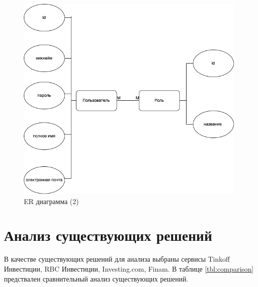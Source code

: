 \begin{figure}[h!]
	\begin{center}
		\includegraphics[scale=0.6]{img/er2.drawio.png}
	\end{center}
	\captionsetup{justification=centering}
	\caption{ER диаграмма (2)}
	\label{img:er2}
\end{figure}
\newpage


\section{Анализ существующих решений}
В качестве существующих решений для анализа выбраны сервисы Tinkoff Инвестиции, RBC Инвестиции, Investing.com, Finam.
В таблице \ref*{tbl:comparison} предствален сравнительный анализ существующих решений.

\begin{table}[H]
	\centering
	\caption{Анализ существующих решений}
	\label{tbl:comparison}
\end{table}


